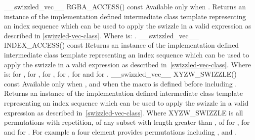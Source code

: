   \addRow
    {\__swizzled_vec__ RGBA_ACCESS() const}
    {
      Available only when .
      \newline \newline
      Returns an instance of the implementation defined intermediate class template  representing an index sequence which can be used to apply the swizzle in a valid expression as described in \ref{swizzled-vec-class}.
      \newline \newline
      Where  is: .
    }
  \addRow
    {\__swizzled_vec__ INDEX_ACCESS() const}
    {
      Returns an instance of the implementation defined intermediate class template  representing an index sequence which can be used to apply the swizzle in a valid expression as described in~\ref{swizzled-vec-class}.
      \newline \newline
      Where  is:  for ,  for ,  for ,  for ,  for  and  for .
    }
  \addRow
    {\__swizzled_vec__ XYZW_SWIZZLE() const}
    {
      Available only when , and when the macro  is defined before including .
      \newline \newline
      Returns an instance of the implementation defined intermediate class template  representing an index sequence which can be used to apply the swizzle in a valid expression as described in~\ref{swizzled-vec-class}.
    \newline \newline
      Where XYZW\_SWIZZLE is all permutations with repetition, of any subset with length greater than , of  for ,  for  and  for . For example a four element  provides permutations including ,  and .
    }
